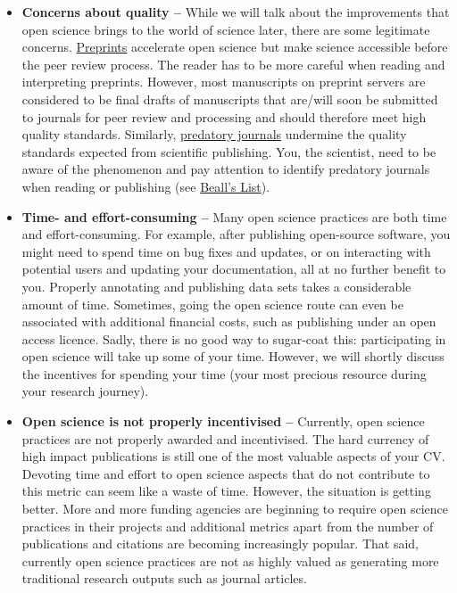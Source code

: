 \documentclass[
]{book}
\begin{document}
\begin{itemize}
\item
  \textbf{Concerns about quality --} While we will talk about the improvements that open science brings to the world of science later, there are some legitimate concerns. \href{https://en.wikipedia.org/wiki/Preprint}{Preprints} accelerate open science but make science accessible before the peer review process. The reader has to be more careful when reading and interpreting preprints. However, most manuscripts on preprint servers are considered to be final drafts of manuscripts that are/will soon be submitted to journals for peer review and processing and should therefore meet high quality standards. Similarly, \href{https://en.wikipedia.org/wiki/Predatory_publishing}{predatory journals} undermine the quality standards expected from scientific publishing. You, the scientist, need to be aware of the phenomenon and pay attention to identify predatory journals when reading or publishing (see \href{https://beallslist.net/}{Beall's List}).
\item
  \textbf{Time- and effort-consuming --} Many open science practices are both time and effort-consuming. For example, after publishing open-source software, you might need to spend time on bug fixes and updates, or on interacting with potential users and updating your documentation, all at no further benefit to you. Properly annotating and publishing data sets takes a considerable amount of time. Sometimes, going the open science route can even be associated with additional financial costs, such as publishing under an open access licence. Sadly, there is no good way to sugar-coat this: participating in open science will take up some of your time. However, we will shortly discuss the incentives for spending your time (your most precious resource during your research journey).
\item
  \textbf{Open science is not properly incentivised --} Currently, open science practices are not properly awarded and incentivised. The hard currency of high impact publications is still one of the most valuable aspects of your CV. Devoting time and effort to open science aspects that do not contribute to this metric can seem like a waste of time. However, the situation is getting better. More and more funding agencies are beginning to require open science practices in their projects and additional metrics apart from the number of publications and citations are becoming increasingly popular. That said, currently open science practices are not as highly valued as generating more traditional research outputs such as journal articles.
\end{itemize}
\end{document}
